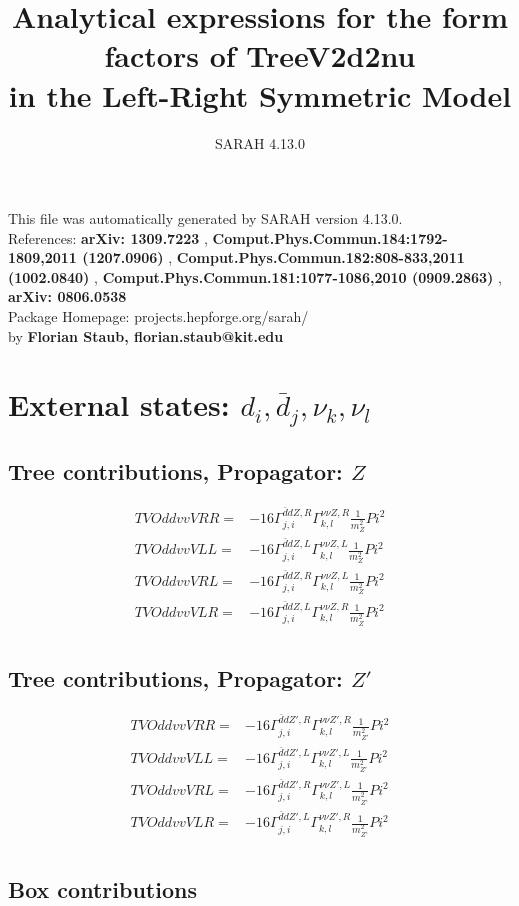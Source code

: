\documentclass[A4,landscape]{article}
\begin{document}
\title{Analytical expressions for the form factors of TreeV2d2nu\\ in the Left-Right Symmetric Model } 
 \author{SARAH 4.13.0} 
 \maketitle 
 \vspace{10cm} 
This file was automatically generated by SARAH version 4.13.0.  \\ 
References: {\bf arXiv: 1309.7223 }, {\bf Comput.Phys.Commun.184:1792-1809,2011 (1207.0906) }, {\bf Comput.Phys.Commun.182:808-833,2011 (1002.0840) }, {\bf Comput.Phys.Commun.181:1077-1086,2010 (0909.2863) }, {\bf arXiv: 0806.0538 } \\ 
Package Homepage: projects.hepforge.org/sarah/ \\ 
by {\bf Florian Staub, florian.staub@kit.edu} 
 \pagebreak 
 \tableofcontents 
 \pagebreak 
\section{External states: ${d_{{i}}, \bar{d}_{{j}}, \nu_{{k}}, \nu_{{l}}}$} 
\subsection{Tree contributions, Propagator: $Z$} 

\begin{align} 
  TVOddvvVRR= & -16 \Gamma^{\bar{d}d Z ,R}_{j, i} \Gamma^{\nu \nu Z ,R}_{k, l} \frac{1}{m^2_{Z}} Pi^2 \\ 
  TVOddvvVLL= & -16 \Gamma^{\bar{d}d Z ,L}_{j, i} \Gamma^{\nu \nu Z ,L}_{k, l} \frac{1}{m^2_{Z}} Pi^2 \\ 
  TVOddvvVRL= & -16 \Gamma^{\bar{d}d Z ,R}_{j, i} \Gamma^{\nu \nu Z ,L}_{k, l} \frac{1}{m^2_{Z}} Pi^2 \\ 
  TVOddvvVLR= & -16 \Gamma^{\bar{d}d Z ,L}_{j, i} \Gamma^{\nu \nu Z ,R}_{k, l} \frac{1}{m^2_{Z}} Pi^2 \\ 
\end{align} 
\subsection{Tree contributions, Propagator: ${Z'}$} 

\begin{align} 
  TVOddvvVRR= & -16 \Gamma^{\bar{d}d {Z'} ,R}_{j, i} \Gamma^{\nu \nu {Z'} ,R}_{k, l} \frac{1}{m^2_{{Z'}}} Pi^2 \\ 
  TVOddvvVLL= & -16 \Gamma^{\bar{d}d {Z'} ,L}_{j, i} \Gamma^{\nu \nu {Z'} ,L}_{k, l} \frac{1}{m^2_{{Z'}}} Pi^2 \\ 
  TVOddvvVRL= & -16 \Gamma^{\bar{d}d {Z'} ,R}_{j, i} \Gamma^{\nu \nu {Z'} ,L}_{k, l} \frac{1}{m^2_{{Z'}}} Pi^2 \\ 
  TVOddvvVLR= & -16 \Gamma^{\bar{d}d {Z'} ,L}_{j, i} \Gamma^{\nu \nu {Z'} ,R}_{k, l} \frac{1}{m^2_{{Z'}}} Pi^2 \\ 
\end{align} 
\subsection{Box contributions} 
\end{document}
